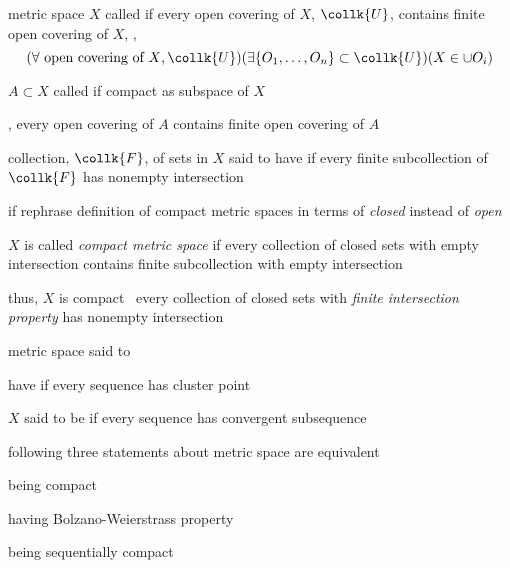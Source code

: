 \documentclass[17pt,landscape]{foils}
\begin{document}
{{	\vitem metric space $X$ called  if
		every open covering of $X$, $\collk{U}$,
		contains finite open covering of $X$,
		\eg,
		\[
			(\forall \mbox{ open covering of $X$}, \collk{U})(\exists \{O_1,\ldots,O_n\} \subset \collk{U})
			(X\in\cup O_i)
		\]

	\vitem $A\subset X$ called  if
		compact as subspace of $X$
	\bit
		\item \ie, every open covering of $A$ contains finite open covering of $A$
	\eit
\eit


\bit
	\item collection, $\collk{F}$, of sets in $X$ said to have
		if every finite subcollection of $\collk{F}$ has nonempty intersection

	\vitem if rephrase definition of compact metric spaces in terms of \emph{closed} instead of \emph{open}
	\bit
		\item $X$ is called \emph{compact metric space}
			if every collection of closed sets with empty intersection
			contains finite subcollection with empty intersection
	\eit

	\vitem thus, $X$ is compact \iaoi\
		every collection of closed sets with \emph{finite intersection property}
		has nonempty intersection
\eit



\bit
	\item metric space said to
	\bit
		\item have 
			if every sequence has cluster point
		\item $X$ said to be 
			if every sequence has convergent subsequence
	\eit

	\vitem {}
\eit



\bit
	\vitem following three statements about metric space are equivalent
	\bit
		\item being compact
		\item having Bolzano-Weierstrass property
		\item being sequentially compact
	\eit

}}
\end{document}
